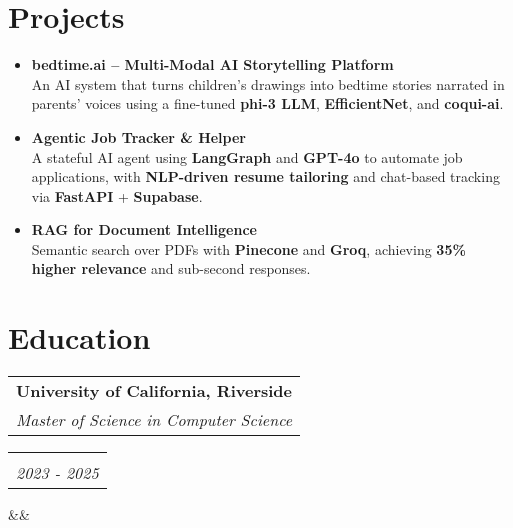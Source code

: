 \documentclass[11pt,a4paper,sans]{moderncv}
\makeatletter
\newcommand*{\customcventry}[7][.13em]{
\begin{tabular}{@{}l}
{\bfseries #4} \\
{\itshape #3}
\end{tabular}
\hfill
\begin{tabular}{l@{}}
{\bfseries #5} \\
{\itshape #2}
\end{tabular}
\ifx&#7&%
\else{%
\begin{minipage}{\maincolumnwidth}%
\small#7%
\end{minipage}}\fi%
\par\addvspace{#1}}
\makeatother
\begin{document}
\section{Projects}
\begin{itemize}[leftmargin=0.6cm, label={\textbullet}]
    \item \textbf{bedtime.ai – Multi-Modal AI Storytelling Platform} \\
    An AI system that turns children’s drawings into bedtime stories narrated in parents’ voices using a fine-tuned \textbf{phi-3 LLM}, \textbf{EfficientNet}, and \textbf{coqui-ai}. 
        
    \item \textbf{Agentic Job Tracker \& Helper} \\
    A stateful AI agent using \textbf{LangGraph} and \textbf{GPT-4o} to automate job applications, with \textbf{NLP-driven resume tailoring} and chat-based tracking via \textbf{FastAPI} + \textbf{Supabase}.
    
    \item \textbf{RAG for Document Intelligence} \\
    Semantic search over PDFs with \textbf{Pinecone} and \textbf{Groq}, achieving \textbf{35\% higher relevance} and sub-second responses.

\end{itemize}


\section{Education}
\customcventry{2023 - 2025}{Master of Science in Computer Science}{University of California, Riverside}{}{}{}
\end{document}
